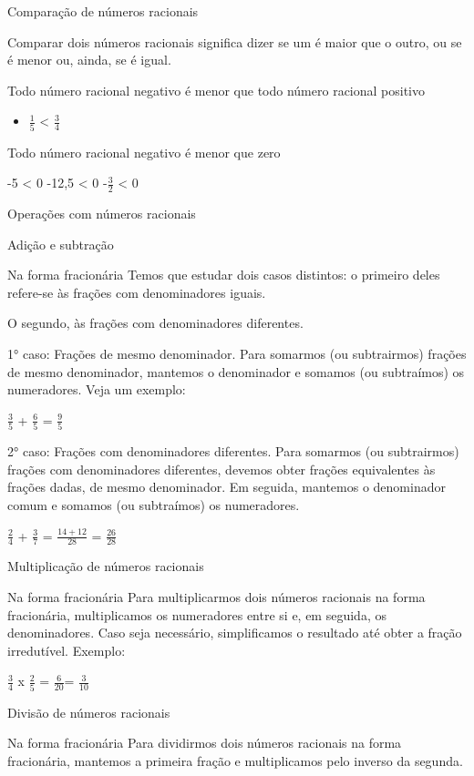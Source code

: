 Comparação de números racionais

Comparar dois números racionais significa dizer se um é maior que o
outro, ou se é menor ou, ainda, se é igual.

Todo número racional negativo é menor que todo número racional positivo

\begin{itemize}
\tightlist
\item
  \(\frac{1}{5}\) \textless{} \(\frac{3}{4}\)
\end{itemize}

Todo número racional negativo é menor que zero

-5 \textless{} 0 -12,5 \textless{} 0 -\(\frac{3}{2}\) \textless{} 0

Operações com números racionais

Adição e subtração

Na forma fracionária Temos que estudar dois casos distintos: o primeiro
deles refere-se às frações com denominadores iguais.

O segundo, às frações com denominadores diferentes.

1° caso: Frações de mesmo denominador. Para somarmos (ou subtrairmos)
frações de mesmo denominador, mantemos o denominador e somamos (ou
subtraímos) os numeradores. Veja um exemplo:

\(\frac{3}{5}\) + \(\frac{6}{5}\) = \(\frac{9}{5}\)

2° caso: Frações com denominadores diferentes. Para somarmos (ou
subtrairmos) frações com denominadores diferentes, devemos obter frações
equivalentes às frações dadas, de mesmo denominador. Em seguida,
mantemos o denominador comum e somamos (ou subtraímos) os numeradores.

\(\frac{2}{4}\) + \(\frac{3}{7}\) = \(\frac{14 + 12}{28}\) =
\(\frac{26}{28}\)

Multiplicação de números racionais

Na forma fracionária Para multiplicarmos dois números racionais na forma
fracionária, multiplicamos os numeradores entre si e, em seguida, os
denominadores. Caso seja necessário, simplificamos o resultado até obter
a fração irredutível. Exemplo:

\(\frac{3}{4}\) x \(\frac{2}{5}\) = \(\frac{6}{20}\)= \(\frac{3}{10}\)

Divisão de números racionais

Na forma fracionária Para dividirmos dois números racionais na forma
fracionária, mantemos a primeira fração e multiplicamos pelo inverso da
segunda.

